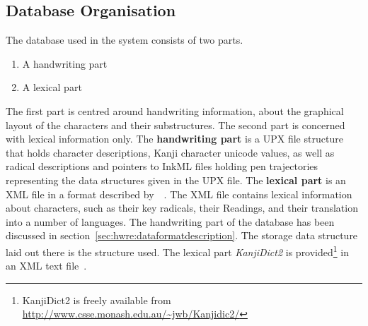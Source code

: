 



\subsection{Database Organisation}
\label{sec:hwre:databaseorganisation}

The database used in the system consists of two parts. 
\begin{enumerate}
\item A handwriting part
\item A lexical part
\end{enumerate}
The first part is centred around handwriting information, 
about the graphical layout of the characters and their substructures.
The second part is concerned with lexical information only.
The \textbf{handwriting part} is a UPX file structure that holds character 
descriptions, Kanji character unicode values, as well as radical descriptions 
and pointers to InkML files holding pen trajectories representing the
data structures given in the UPX file.
The \textbf{lexical part} is an XML file in a format described 
by~~\citeyear{Breen2004}. The XML file contains 
lexical information about characters, such as their key radicals, their Readings,
and their translation into a number of languages.
The handwriting part of the database has been discussed in 
section~\ref{sec:hwre:dataformatdescription}. The storage data structure laid
out there is the structure used.
The lexical part \emph{KanjiDict2} is 
provided\footnote{KanjiDict2 is freely available from \url{http://www.csse.monash.edu.au/~jwb/Kanjidic2/}} in an XML text file~.

